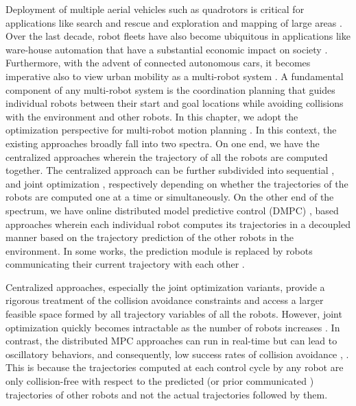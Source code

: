 Deployment of multiple aerial vehicles such as quadrotors is critical for applications like search and rescue and exploration and mapping of large areas \citep{schranz2020swarm}. Over the last decade, robot fleets have also become ubiquitous in applications like ware-house automation that have a substantial economic impact on society \citep{bolu2021adaptive,priority_seq}. Furthermore, with the advent of connected autonomous cars, it becomes imperative also to view urban mobility as a multi-robot system \citep{zhou2017collision}. A fundamental component of any multi-robot system is the coordination planning that guides individual robots between their start and goal locations while avoiding collisions with the environment and other robots. In this chapter, we adopt the optimization perspective for multi-robot motion planning \citep{aks_ral21}. In this context, the existing approaches broadly fall into two spectra. On one end, we have the centralized approaches wherein the trajectory of all the robots are computed together. The centralized approach can be further subdivided into sequential \citep{incremental_scp_how}, \cite{park2020efficient} and joint optimization \citep{rafaella_scp}, \citep{aks_ral21} respectively depending on whether the trajectories of the robots are computed one at a time or simultaneously. On the other end of the spectrum, we have online distributed model predictive control (DMPC) \citep{dmpc_carlos}, \citep{dmpc_epfl} based approaches wherein each individual robot computes its trajectories in a decoupled manner based on the trajectory prediction of the other robots in the environment. In some works, the prediction module is replaced by robots communicating their current trajectory with each other \citep{dmpc_carlos_2}. 

Centralized approaches, especially the joint optimization variants, provide a rigorous treatment of the collision avoidance constraints and access a larger feasible space formed by all trajectory variables of all the robots. However, joint optimization quickly becomes intractable as the number of robots increases \citep{chen2015decoupled}. In contrast, the distributed MPC approaches can run in real-time but can lead to oscillatory behaviors, and consequently, low success rates of collision avoidance \citep{dmpc_carlos}, \citep{dmpc_carlos_2}. This is because the trajectories computed at each control cycle by any robot are only collision-free with respect to the predicted (or prior communicated ) trajectories of other robots and not the actual trajectories followed by them. 

